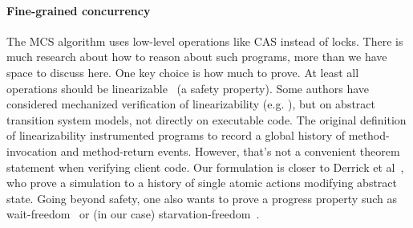 %
%
%

\paragraph{Fine-grained concurrency}
The MCS algorithm uses low-level operations like CAS instead of
locks. There is much research about how to reason about such programs,
more than we have space to discuss here. One key choice is how much to
prove. At least all operations should be
linearizable~\cite{herlihy:linearizability} (a safety property). Some
authors have considered mechanized verification of linearizability
(e.g. \cite{doherty:lock-free,derrick:mechanical-linearizability}),
but on abstract transition system models, not directly on executable
code. The original definition of linearizability instrumented programs
to record a global history of method-invocation and method-return
events. However, that's not a convenient theorem statement when
verifying client code. Our formulation is closer to Derrick et
al~\cite{derrick:mechanical-linearizability}, who prove a simulation
to a history of single atomic actions modifying abstract state.  Going
beyond safety, one also wants to prove a progress property such as
wait-freedom~\cite{herlihy:wait-freedom} or (in our case)
starvation-freedom~\cite{Herlihy08book}.

